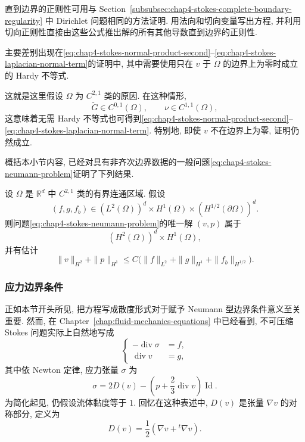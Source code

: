 直到边界的正则性可用与 Section~\ref{subsubsec:chap4-stokes-complete-boundary-regularity} 中 Dirichlet 问题相同的方法证明. 用法向和切向变量写出方程, 并利用切向正则性直接由这些公式推出解的所有其他导数直到边界的正则性.

主要差别出现在\eqref{eq:chap4-stokes-normal-product-second}--\eqref{eq:chap4-stokes-laplacian-normal-term}的证明中, 其中需要使用只在 $v$ 于 $\Omega$ 的边界上为零时成立的 Hardy 不等式.

这就是这里假设 $\Omega$ 为 $C^{2,1}$ 类的原因. 在这种情形,
\[
 \widetilde G\in C^{0,1}(\Omega),\qquad\nu\in C^{1,1}(\Omega),
\]
这意味着无需 Hardy 不等式也可得到\eqref{eq:chap4-stokes-normal-product-second}--\eqref{eq:chap4-stokes-laplacian-normal-term}. 特别地, 即使 $v$ 不在边界上为零, 证明仍然成立.

概括本小节内容, 已经对具有非齐次边界数据的一般问题\eqref{eq:chap4-stokes-neumann-problem}证明了下列结果.

\begin{Theorem}
\label{thm:chap4-stokes-neumann-h2-regularity}
设 $\Omega$ 是 $\mathbb R^d$ 中 $C^{2,1}$ 类的有界连通区域. 假设
\[
 (f,g,f_b)\in(L^2(\Omega))^d\times H^1(\Omega)\times(H^{1/2}(\partial\Omega))^d.
\]
则问题\eqref{eq:chap4-stokes-neumann-problem}的唯一解 $(v,p)$ 属于
\[
 (H^2(\Omega))^d\times H^1(\Omega),
\]
并有估计
\[
 \|v\|_{H^2}+\|p\|_{H^1}
 \leq C\bigl(\|f\|_{L^2}+\|g\|_{H^1}+\|f_b\|_{H^{1/2}}\bigr).
\]
\end{Theorem}

\subsubsection{应力边界条件}
\label{subsec:chap4-physical-stress-boundary}

正如本节开头所见, 把方程写成散度形式对于赋予 Neumann 型边界条件意义至关重要. 然而, 在 Chapter~\ref{chap:fluid-mechanics-equations} 中已经看到, 不可压缩 Stokes 问题实际上自然地写成
\begin{equation}
 \left\{
 \begin{aligned}
  -\operatorname{div}\sigma&=f,\\
  \operatorname{div}v&=g,
 \end{aligned}
 \right.
 \label{eq:chap4-stress-divergence-form}
\end{equation}
其中依 Newton 定律, 应力张量 $\sigma$ 为
\[
 \sigma=2D(v)-\left(p+\frac23\operatorname{div}v\right)\operatorname{Id}.
\]
为简化起见, 仍假设流体黏度等于 $1$. 回忆在这种表述中, $D(v)$ 是张量 $\nabla v$ 的对称部分, 定义为
\[
 D(v)=\frac12(\nabla v+{}^t\nabla v).
\]

